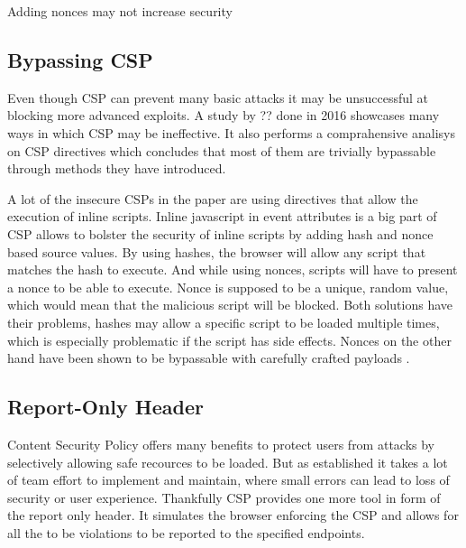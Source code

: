 \documentclass[11]{article}   %
\begin{document}
%
%




Adding nonces may not increase security

\subsection{Bypassing CSP}
Even though CSP can prevent many basic attacks it may be unsuccessful at blocking more advanced exploits.
A study by ?? \cite{??} done in 2016 showcases many ways in which CSP may be ineffective. 
It also performs a comprahensive analisys on CSP directives which concludes that most of them are trivially bypassable through methods they have introduced.

A lot of the insecure CSPs in the paper are using directives that allow the execution of inline scripts.
Inline javascript in event attributes is a big part of 
CSP allows to bolster the security of inline scripts by adding hash and nonce based source values.
By using hashes, the browser will allow any script that matches the hash to execute.
And while using nonces, scripts will have to present a nonce to be able to execute. 
Nonce is supposed to be a unique, random value, which would mean that the malicious script will be blocked.
Both solutions have their problems, hashes may allow a specific script to be loaded multiple times, which is especially problematic if the script has side effects.
Nonces on the other hand have been shown to be bypassable with carefully crafted payloads \cite{???}.



\subsection{Report-Only Header}
Content Security Policy offers many benefits to protect users from attacks by selectively allowing safe recources to be loaded.
But as established it takes a lot of team effort to implement and maintain, where small errors can lead to loss of security or user experience.
Thankfully CSP provides one more tool in form of the report only header.
It simulates the browser enforcing the CSP and allows for all the to be violations to be reported to the specified endpoints.
\end{document}
